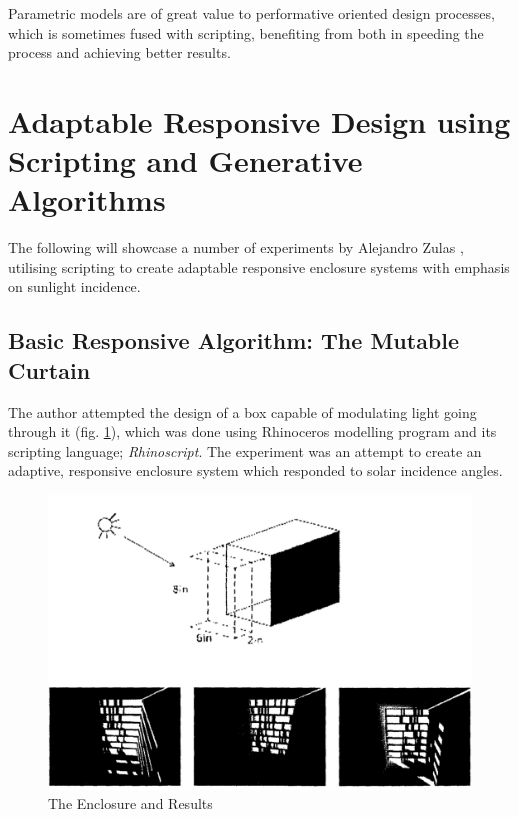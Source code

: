 Parametric models are of great value to performative oriented design processes, which is sometimes fused with scripting, benefiting from both in speeding the process and achieving better results.

\clearpage
\section{Adaptable Responsive Design using Scripting and Generative Algorithms}

The following will showcase a number of experiments by Alejandro Zulas \cite{zulas04}, utilising scripting to create adaptable responsive enclosure systems with emphasis on sunlight incidence.

\subsection{Basic Responsive Algorithm: The Mutable Curtain}

The author attempted the design of a box capable of modulating light going through it (fig. \ref{fig:AZulasEncl}), which was done using Rhinoceros modelling program and its scripting language; \emph{Rhinoscript}. The experiment was an attempt to create an adaptive, responsive enclosure system which responded to solar incidence angles. 

\begin{figure}[htbp]
\centering
\includegraphics[width=\textwidth]{./Images/1-Enclosure}
\caption[Responsive Adaptable Enclosure Experiment]{The Enclosure and Results \cite{zulas04}}
\label{fig:AZulasEncl}
\end{figure}

